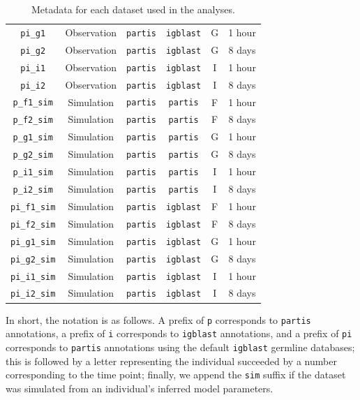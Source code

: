 \documentclass{article}
\begin{document}
\begin{table}
{\begin{tabular}{c|c|c|c|c|c}
    \texttt{pi\_g1} & Observation &    \texttt{partis} & \texttt{igblast} & G & 1 hour\\
    \texttt{pi\_g2} & Observation &    \texttt{partis} & \texttt{igblast} & G & 8 days\\
    \texttt{pi\_i1} & Observation &    \texttt{partis} & \texttt{igblast} & I & 1 hour\\
    \texttt{pi\_i2} & Observation &    \texttt{partis} & \texttt{igblast} & I & 8 days\\
    \texttt{p\_f1\_sim} & Simulation & \texttt{partis} & \texttt{partis} & F & 1 hour\\
    \texttt{p\_f2\_sim} & Simulation & \texttt{partis} & \texttt{partis} & F & 8 days\\
    \texttt{p\_g1\_sim} & Simulation & \texttt{partis} & \texttt{partis} & G & 1 hour\\
    \texttt{p\_g2\_sim} & Simulation & \texttt{partis} & \texttt{partis} & G & 8 days\\
    \texttt{p\_i1\_sim} & Simulation & \texttt{partis} & \texttt{partis} & I & 1 hour\\
    \texttt{p\_i2\_sim} & Simulation & \texttt{partis} & \texttt{partis} & I & 8 days\\
    \texttt{pi\_f1\_sim} & Simulation& \texttt{partis} & \texttt{igblast} & F & 1 hour\\
    \texttt{pi\_f2\_sim} & Simulation& \texttt{partis} & \texttt{igblast} & F & 8 days\\
    \texttt{pi\_g1\_sim} & Simulation& \texttt{partis} & \texttt{igblast} & G & 1 hour\\
    \texttt{pi\_g2\_sim} & Simulation& \texttt{partis} & \texttt{igblast} & G & 8 days\\
    \texttt{pi\_i1\_sim} & Simulation& \texttt{partis} & \texttt{igblast} & I & 1 hour\\
    \texttt{pi\_i2\_sim} & Simulation& \texttt{partis} & \texttt{igblast} & I & 8 days\\
\end{tabular}
}
\caption{Metadata for each dataset used in the analyses.}
\label{tab:Datasets}
\end{table}
In short, the notation is as follows.
A prefix of \texttt{p} corresponds to \texttt{partis} annotations, a prefix of \texttt{i} corresponds to \texttt{igblast} annotations, and a prefix of \texttt{pi} corresponds to \texttt{partis} annotations using the default \texttt{igblast} germline databases;
this is followed by a letter representing the individual succeeded by a number corresponding to the time point;
finally, we append the \texttt{sim} suffix if the dataset was simulated from an individual's inferred model parameters.
\end{document}
